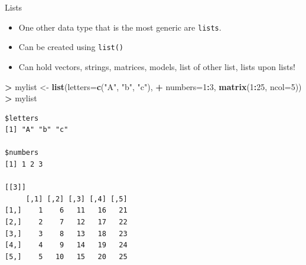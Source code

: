 \documentclass[
  ignorenonframetext,
]{beamer}
\newenvironment{Shaded}{\begin{snugshade}}{\end{snugshade}}
\newcommand{\DataTypeTok}[1]{\textcolor[rgb]{0.13,0.29,0.53}{#1}}
\newcommand{\DecValTok}[1]{\textcolor[rgb]{0.00,0.00,0.81}{#1}}
\newcommand{\KeywordTok}[1]{\textcolor[rgb]{0.13,0.29,0.53}{\textbf{#1}}}
\newcommand{\NormalTok}[1]{#1}
\newcommand{\OperatorTok}[1]{\textcolor[rgb]{0.81,0.36,0.00}{\textbf{#1}}}
\newcommand{\StringTok}[1]{\textcolor[rgb]{0.31,0.60,0.02}{#1}}
\providecommand{\tightlist}{%
  \setlength{\itemsep}{0pt}\setlength{\parskip}{0pt}}
\begin{document}
\begin{frame}[fragile]{Lists}
\protect\hypertarget{lists}{}

\begin{itemize}
\tightlist
\item
  One other data type that is the most generic are \texttt{lists}.
\item
  Can be created using \texttt{list()}
\item
  Can hold vectors, strings, matrices, models, list of other list, lists
  upon lists!
\end{itemize}

\begin{Shaded}
\begin{Highlighting}[]
\OperatorTok{>}\StringTok{ }\NormalTok{mylist <-}\StringTok{ }\KeywordTok{list}\NormalTok{(}\DataTypeTok{letters=}\KeywordTok{c}\NormalTok{(}\StringTok{"A"}\NormalTok{, }\StringTok{"b"}\NormalTok{, }\StringTok{"c"}\NormalTok{), }
\OperatorTok{+}\StringTok{         }\DataTypeTok{numbers=}\DecValTok{1}\OperatorTok{:}\DecValTok{3}\NormalTok{, }\KeywordTok{matrix}\NormalTok{(}\DecValTok{1}\OperatorTok{:}\DecValTok{25}\NormalTok{, }\DataTypeTok{ncol=}\DecValTok{5}\NormalTok{))}
\OperatorTok{>}\StringTok{ }\NormalTok{mylist}
\end{Highlighting}
\end{Shaded}

\begin{verbatim}
$letters
[1] "A" "b" "c"

$numbers
[1] 1 2 3

[[3]]
     [,1] [,2] [,3] [,4] [,5]
[1,]    1    6   11   16   21
[2,]    2    7   12   17   22
[3,]    3    8   13   18   23
[4,]    4    9   14   19   24
[5,]    5   10   15   20   25
\end{verbatim}

\end{frame}
\end{document}
